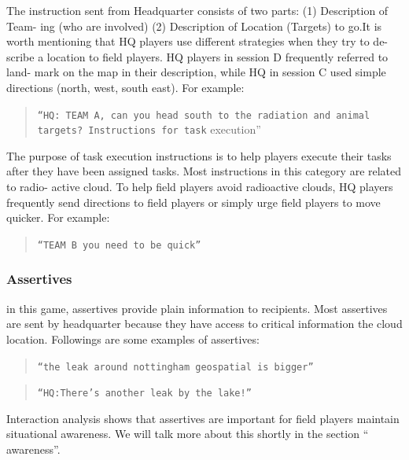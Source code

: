 The instruction sent from Headquarter consists of two parts: (1) Description of Team- ing (who are involved) (2) Description of Location (Targets) to go.It is worth mentioning that HQ players use different strategies when they try to de- scribe a location to field players. HQ players in session D frequently referred to land- mark on the map in their description, while HQ in session C used simple directions (north, west, south east). For example:\\

\begin{quote}
\texttt{``HQ: TEAM A, can you head south to the radiation and animal targets? Instructions for task} execution''\\
\end{quote}

The purpose of task execution instructions is to help players execute their tasks after they have been assigned tasks. Most instructions in this category are related to radio- active cloud. To help field players avoid radioactive clouds, HQ players frequently send directions to field players or simply urge field players to move quicker. For example:

\begin{quote}
\texttt{``TEAM B you need to be quick''} \\
\end{quote}

\subsubsection{Assertives}

in this game, assertives provide plain information to recipients. Most assertives are sent by headquarter because they have access to critical information the cloud location. Followings are some examples of assertives:\\

\begin{quote}
\texttt{``the leak around nottingham geospatial is bigger''}\\
\end{quote}

\begin{quote}
\texttt{``HQ:There's another leak by the lake!''}\\
\end{quote}

Interaction analysis shows that assertives are important for field players maintain situational awareness. We will talk more about this shortly in the section `` awareness''.\\

